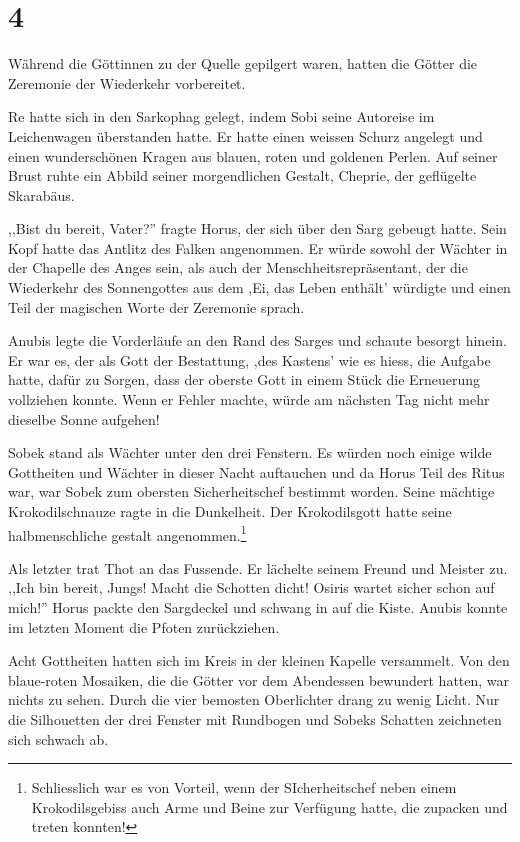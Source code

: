 \documentclass[11pt,titlepage,a5paper]{book}
\begin{document}
\section*{4}

Während die Göttinnen zu der Quelle gepilgert waren, hatten die Götter die Zeremonie der Wiederkehr vorbereitet. 

Re hatte sich in den Sarkophag gelegt, indem Sobi seine Autoreise im Leichenwagen überstanden hatte. Er hatte einen weissen Schurz angelegt und einen wunderschönen Kragen aus blauen, roten und goldenen Perlen. Auf seiner Brust ruhte ein Abbild seiner morgendlichen Gestalt, Cheprie, der geflügelte Skarabäus. 

,,Bist du bereit, Vater?'' fragte Horus, der sich über den Sarg gebeugt hatte. Sein Kopf hatte das Antlitz des Falken angenommen. Er würde sowohl der Wächter in der Chapelle des Anges sein, als auch der Menschheitsrepräsentant, der die Wiederkehr des Sonnengottes aus dem ,Ei, das Leben enthält' würdigte und einen Teil der magischen Worte der Zeremonie sprach.

Anubis legte die Vorderläufe an den Rand des Sarges und schaute besorgt hinein. Er war es, der als Gott der Bestattung, ,des Kastens' wie es hiess, die Aufgabe hatte, dafür zu Sorgen, dass der oberste Gott in einem Stück die Erneuerung vollziehen konnte. Wenn er Fehler machte, würde am nächsten Tag nicht mehr dieselbe Sonne aufgehen!

Sobek stand als Wächter unter den drei Fenstern. Es würden noch einige wilde Gottheiten und Wächter in dieser Nacht auftauchen und da Horus Teil des Ritus war, war Sobek zum obersten Sicherheitschef bestimmt worden. Seine mächtige Krokodilschnauze ragte in die Dunkelheit. Der Krokodilsgott hatte seine halbmenschliche gestalt angenommen.\footnote{Schliesslich war es von Vorteil, wenn der SIcherheitschef neben einem Krokodilsgebiss auch Arme und Beine zur Verfügung hatte, die zupacken und treten konnten!}

Als letzter trat Thot an das Fussende. Er lächelte seinem Freund und Meister zu. ,,Ich bin bereit, Jungs! Macht die Schotten dicht! Osiris wartet sicher schon auf mich!'' Horus packte den Sargdeckel und schwang in auf die Kiste. Anubis konnte im letzten Moment die Pfoten zurückziehen.

Acht Gottheiten hatten sich im Kreis in der kleinen Kapelle versammelt. Von den blaue-roten Mosaiken, die die Götter vor dem Abendessen bewundert hatten, war nichts zu sehen. Durch die vier bemosten Oberlichter drang zu wenig Licht. Nur die Silhouetten der drei Fenster mit Rundbogen und Sobeks Schatten zeichneten sich schwach ab.
\end{document}

